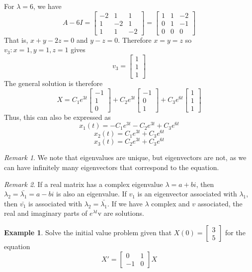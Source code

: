 \documentclass[11pt]{article}
\theoremstyle{plain} %
\theoremstyle{definition}
\theoremstyle{example}
\newtheorem*{example}{Example}
\theoremstyle{remark}
\newtheorem*{remark}{Remark}
\begin{document}
For $\lambda = 6$, we have
$$A - 6I = \begin{bmatrix}-2 & 1 & 1\\ 1 & -2 & 1 \\ 1 & 1 & -2\end{bmatrix} = \begin{bmatrix}1 & 1 & -2\\ 0 & 1 & -1 \\ 0 & 0 & 0\end{bmatrix}$$
That is, $x+y-2z=0$ and $y-z=0$. Therefore $x = y= z$ so $v_3:x = 1, y = 1, z= 1$ gives
$$v_3 = \begin{bmatrix}1 \\ 1 \\1\end{bmatrix}$$The general solution is therefore $$X = C_1e^{3t}\begin{bmatrix}-1 \\ 1\\ 0\end{bmatrix} + C_2e^{3t}\begin{bmatrix}-1 \\ 0\\ 1\end{bmatrix} + C_3e^{6t}\begin{bmatrix}1 \\ 1\\ 1\end{bmatrix}$$
Thus, this can also be expressed as 
$$x_1(t) =- C_1e^{3t}- C_2e^{3t}+ C_3e^{6t}$$
$$x_2(t) = C_1e^{3t}+ C_3e^{6t}$$
$$x_3(t) = C_2e^{3t}+ C_3e^{6t}$$



\begin{remark}
We note that eigenvalues are unique, but eigenvectors are not, as we can have infinitely many eigenvectors that correspond to the equation. 
\end{remark}
\begin{remark}If a real matrix has a complex eigenvalue $\lambda = a+bi$, then $\lambda_2 = \bar{\lambda_1} = a-bi$ is also an eigenvalue. If $v_1$ is an eigenvector associated with $\lambda_1$, then $\bar{v_1}$ is associated with $\lambda_2 = \bar{\lambda_1}$. If we have $\lambda$ complex and $v$ associated, the real and imaginary parts of $e^{\lambda t}$v are solutions. 
\end{remark}

\begin{example}
Solve the initial value problem given that $X(0) = \begin{bmatrix}3\\5\end{bmatrix}$ for the equation $$X' = \begin{bmatrix}0 & 1 \\ -1 & 0\end{bmatrix}X$$
\end{example}
\end{document}

